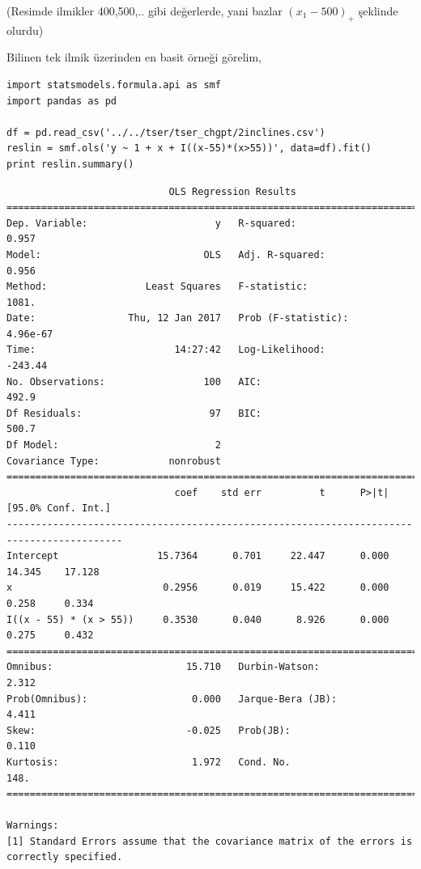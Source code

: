 \documentclass[12pt,fleqn]{article}\usepackage{../../common}
\begin{document}
(Resimde ilmikler 400,500,.. gibi değerlerde, yani bazlar $(x_1-500)_{+}$
şeklinde olurdu)

Bilinen tek ilmik üzerinden en basit örneği görelim,

\begin{verbatim}
import statsmodels.formula.api as smf
import pandas as pd

df = pd.read_csv('../../tser/tser_chgpt/2inclines.csv')
reslin = smf.ols('y ~ 1 + x + I((x-55)*(x>55))', data=df).fit()
print reslin.summary()
\end{verbatim}

\begin{verbatim}
                            OLS Regression Results                            
==============================================================================
Dep. Variable:                      y   R-squared:                       0.957
Model:                            OLS   Adj. R-squared:                  0.956
Method:                 Least Squares   F-statistic:                     1081.
Date:                Thu, 12 Jan 2017   Prob (F-statistic):           4.96e-67
Time:                        14:27:42   Log-Likelihood:                -243.44
No. Observations:                 100   AIC:                             492.9
Df Residuals:                      97   BIC:                             500.7
Df Model:                           2                                         
Covariance Type:            nonrobust                                         
==========================================================================================
                             coef    std err          t      P>|t|      [95.0% Conf. Int.]
------------------------------------------------------------------------------------------
Intercept                 15.7364      0.701     22.447      0.000        14.345    17.128
x                          0.2956      0.019     15.422      0.000         0.258     0.334
I((x - 55) * (x > 55))     0.3530      0.040      8.926      0.000         0.275     0.432
==============================================================================
Omnibus:                       15.710   Durbin-Watson:                   2.312
Prob(Omnibus):                  0.000   Jarque-Bera (JB):                4.411
Skew:                          -0.025   Prob(JB):                        0.110
Kurtosis:                       1.972   Cond. No.                         148.
==============================================================================

Warnings:
[1] Standard Errors assume that the covariance matrix of the errors is correctly specified.
\end{verbatim}
\end{document}
